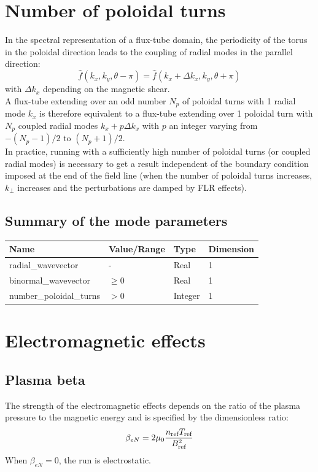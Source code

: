 \documentclass[fleqn]{report}
\begin{document}
\section{Number of poloidal turns}
In the spectral representation of a flux-tube domain, the periodicity of the torus in the poloidal direction leads to the coupling of radial modes in the parallel direction:
$$\hat{f}(k_x,k_y,\theta-\pi)=\hat{f}(k_x+\Delta k_x,k_y,\theta+\pi)$$
with $\Delta k_x$ depending on the magnetic shear.\\
A flux-tube extending over an odd number $N_p$ of poloidal turns with 1 radial mode $k_x$ is therefore equivalent to a flux-tube extending over 1 poloidal turn with $N_p$ coupled radial modes $k_x + p\Delta k_x$ with $p$ an integer varying from $-(N_p-1)/2$ to $(N_p+1)/2$.\\ 
In practice, running with a sufficiently high number of poloidal turns (or coupled radial modes) is necessary to get a result independent of the boundary condition imposed at the end of the field line (when the number of poloidal turns increases, $k_\perp$ increases and the perturbations are damped by FLR effects). 

\subsection{Summary of the mode parameters}
\begin{tabularx}{\textwidth}{|X|Y|Y|Y|}
\hline
Name & Value/Range & Type & Dimension \\
\hline
radial\_wavevector & - & Real & 1 \\
binormal\_wavevector & $\geq 0$ & Real & 1 \\
number\_poloidal\_turns & $>0$ & Integer & 1 \\
\hline
\end{tabularx}

\section{Electromagnetic effects}
\subsection{Plasma beta}
The strength of the electromagnetic effects depends on the ratio of the plasma pressure to the magnetic energy and is specified by the dimensionless ratio:
\begin{equation}
\beta_{eN} = 2\mu_0 \frac{n_{\textrm{ref}} T_{\textrm{ref}}}{B_{\textrm{ref}}^2}
\end{equation}
When $\beta_{eN}=0$, the run is electrostatic. 
\end{document}
